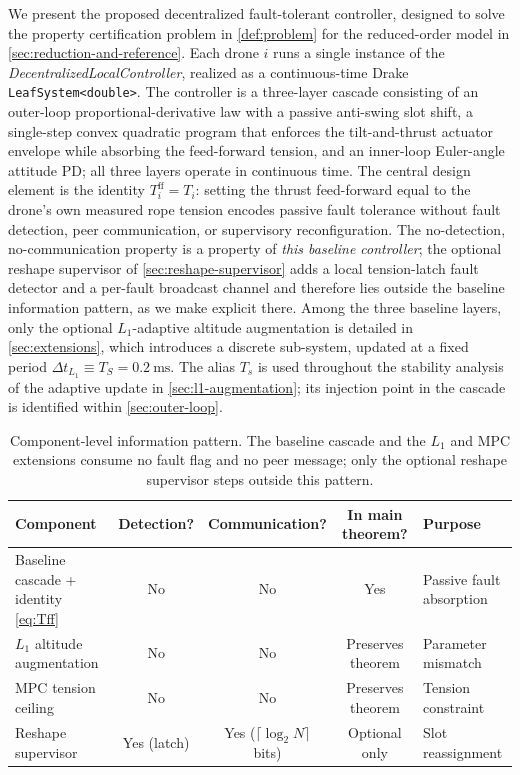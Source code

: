 We present the proposed decentralized fault-tolerant controller, designed to solve the property certification problem in \cref{def:problem} for the reduced-order model in \cref{sec:reduction-and-reference}. Each drone $i$ runs a single instance of the \textit{DecentralizedLocalController}, realized as a continuous-time Drake \texttt{LeafSystem<double>}. The controller is a three-layer cascade consisting of an outer-loop proportional-derivative law with a passive anti-swing slot shift, a single-step convex quadratic program that enforces the tilt-and-thrust actuator envelope while absorbing the feed-forward tension, and an inner-loop Euler-angle attitude PD; all three layers operate in continuous time. The central design element is the identity $T_i^{\mathrm{ff}} = T_i$: setting the thrust feed-forward equal to the drone's own measured rope tension encodes passive fault tolerance without fault detection, peer communication, or supervisory reconfiguration. The no-detection, no-communication property is a property of \emph{this baseline controller}; the optional reshape supervisor of \cref{sec:reshape-supervisor} adds a local tension-latch fault detector and a per-fault broadcast channel and therefore lies outside the baseline information pattern, as we make explicit there. Among the three baseline layers, only the optional $L_1$-adaptive altitude augmentation is detailed in \cref{sec:extensions}, which introduces a discrete sub-system, updated at a fixed period $\Delta t_{L_1} \equiv T_S = \SI{0.2}{\milli\second}$. The alias $T_s$ is used throughout the stability analysis of the adaptive update in \cref{sec:l1-augmentation}; its injection point in the cascade is identified within \cref{sec:outer-loop}.



\begin{table}[htbp]
  \centering
  \caption{Component-level information pattern. The baseline cascade and the $L_1$ and MPC extensions consume no fault flag and no peer message; only the optional reshape supervisor steps outside this pattern.}
  \label{tab:component-pattern}
  \small
  \begin{tabular}{p{4.5cm}cccp{3.0cm}}
    \toprule
    Component & Detection? & Communication? & In main theorem? & Purpose \\
    \midrule
    Baseline cascade + identity \eqref{eq:Tff} & No & No & Yes & Passive fault absorption \\
    $L_1$ altitude augmentation & No & No & Preserves theorem & Parameter mismatch \\
    MPC tension ceiling & No & No & Preserves theorem & Tension constraint \\
    Reshape supervisor & Yes (latch) & Yes ($\lceil\log_2 N\rceil$ bits) & Optional only & Slot reassignment \\
    \bottomrule
  \end{tabular}
\end{table}

